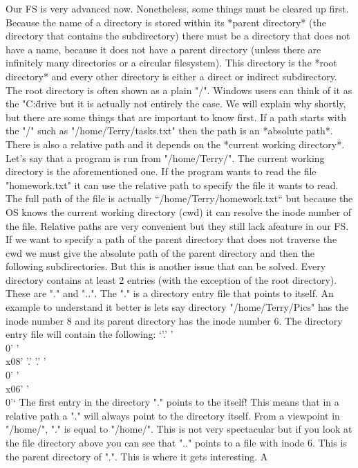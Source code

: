Our FS is very advanced now. Nonetheless, some things must be cleared up first. Because the name of
a directory is stored within its *parent directory* (the directory that contains the subdirectory)
there must be a directory that does not have a name, because it does not have a parent directory
(unless there are infinitely many directories or a circular filesystem). This directory is the *root
directory* and every other directory is either a direct or indirect subdirectory. The root directory
is often shown as a plain "/". Windows users can think of it as the "C:\" drive but it is actually not
entirely the case. We will explain why shortly, but there are some things that are important to know
first. If a path starts with the "/" such as "/home/Terry/tasks.txt" then the path is an *absolute
path*. There is also a relative path and it depends on the *current working directory*. Let's say that
a program is run from "/home/Terry/". The current working directory is the aforementioned one. If the 
program wants to read the file "homework.txt" it can use the relative path to specify the file it
wants to read. The full path of the file is actually “/home/Terry/homework.txt“ but because the OS
knows the current working directory (cwd) it can resolve the inode number of the file. Relative paths
are very convenient but they still lack afeature in our FS. If we want to specify a path of the parent
directory that does not traverse the cwd we must give the absolute path of the parent directory and
then the following subdirectories. But this is another issue that can be solved. Every directory
contains at least 2 entries (with the exception of the root directory). These are "." and "..". The
"." is a directory entry file that points to itself. An example to understand it better is lets say
directory "/home/Terry/Pics" has the inode number 8 and its parent directory has the inode number 6.
The directory entry file will contain the following:
\newline{}
`'.' '\\0' '\\x08' '.' '.' '\\0' '\\x06' '\\0'`
The first entry in the directory "." points to the itself! This means that in a relative path a "."
will always point to the directory itself. From a viewpoint in "/home/", "." is equal to "/home/".
This is not very spectacular but if you look at the file directory above you can see that ".." points
to a file with inode 6. This is the parent directory of ".". This is where it gets interesting. A
